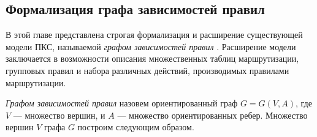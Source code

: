\documentclass[../thesis.tex]{subfiles}
\begin{document}

\subsection{Формализация графа зависимостей правил}

В этой главе представлена строгая формализация и расширение существующей модели ПКС, называемой \textit{графом зависимостей правил} \cite{kazemian2013real}.
Расширение модели заключается в возможности описания множественных таблиц маршрутизации, групповых правил и набора различных действий, производимых правилами маршрутизации.

\textit{Графом зависимостей правил} назовем ориентированный граф $G=$\linebreak$G(V,A)$, где $V$ --- множество вершин, и $A$ --- множество ориентированных ребер.
Множество вершин $V$ графа $G$ построим следующим образом.
\end{document}
